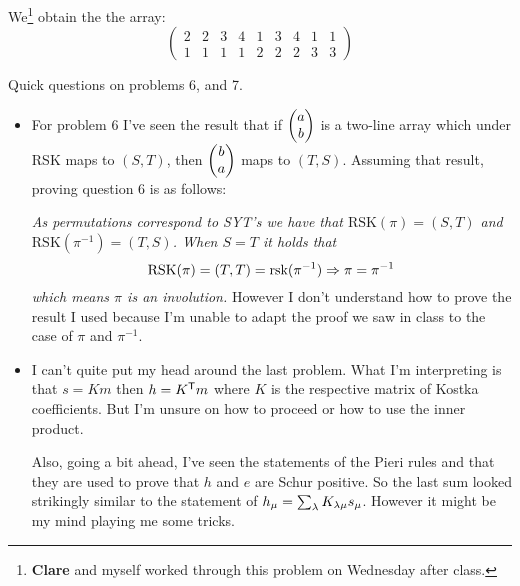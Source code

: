 \documentclass[12pt]{memoir}
\begin{document}
\begin{ptcbr}
    We\footnote{\textbf{Clare} and myself worked through this problem on Wednesday after class.} obtain the the array:
    $$\begin{pmatrix}
        2&2&3&4&1&3&4&1&1\\
        1&1&1&1&2&2&2&3&3
    \end{pmatrix}$$
\end{ptcbr}

Quick questions on problems 6, and 7.
\begin{itemize}
    \item For problem 6 I've seen the result that if $\begin{pmatrix} a \\ b \end{pmatrix}$ is a two-line array which under RSK maps to $(S,T)$, then $\begin{pmatrix} b \\ a \end{pmatrix}$ maps to $(T,S)$. Assuming that result, proving question 6 is as follows:\par 
    \emph{As permutations correspond to SYT's we have that $\text{RSK}(\pi)=(S,T)$ and $\text{RSK}(\pi^{-1})=(T,S)$. When $S=T$ it holds that}
    $$\text{RSK}(\pi)=(T,T)=\text{rsk}(\pi^{-1})\Rightarrow \pi=\pi^{-1}$$
    \emph{which means $\pi$ is an involution.} However I don't understand how to prove the result I used because I'm unable to adapt the proof we saw in class to the case of $\pi$ and $\pi^{-1}$.
    \item I can't quite put my head around the last problem. What I'm interpreting is that $s=Km$ then $h=K^{\mathsf{T}}m$ where $K$ is the respective matrix of Kostka coefficients. But I'm unsure on how to proceed or how to use the inner product.\par 
    Also, going a bit ahead, I've seen the statements of the Pieri rules and that they are used to prove that $h$ and $e$ are Schur positive. So the last sum looked strikingly similar to the statement of $h_{\mu}=\sum_\lambda K_{\lambda\mu}s_\mu$. However it might be my mind playing me some tricks.
\end{itemize}
\end{document}
